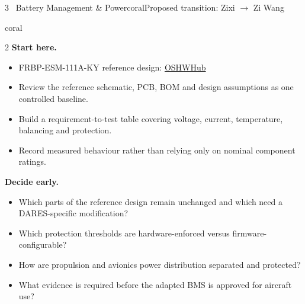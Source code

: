 \documentclass[10pt,a4paper]{article}
\begin{document}
\begin{project}{3 \, Battery Management \& Power}{coral}{Proposed transition: Zixi $\rightarrow$ Zi Wang}
\begin{research}{coral}
\smallskip
\begin{multicols}{2}\RaggedRight
\textbf{Start here.}
\begin{itemize}
  \item FRBP-ESM-111A-KY reference design: \href{https://oshwhub.com/frostautumn/frbp-esm-111a-ky}{OSHWHub}
  \item Review the reference schematic, PCB, BOM and design assumptions as one controlled baseline.
  \item Build a requirement-to-test table covering voltage, current, temperature, balancing and protection.
  \item Record measured behaviour rather than relying only on nominal component ratings.
\end{itemize}
\columnbreak
\textbf{Decide early.}
\begin{itemize}
  \item Which parts of the reference design remain unchanged and which need a DARES-specific modification?
  \item Which protection thresholds are hardware-enforced versus firmware-configurable?
  \item How are propulsion and avionics power distribution separated and protected?
  \item What evidence is required before the adapted BMS is approved for aircraft use?
\end{itemize}
\end{multicols}
\end{research}
\end{project}
\end{document}
